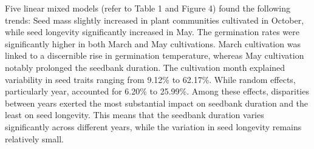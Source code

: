 \documentclass[a4paper, 11, margin=2cm]{article}
\begin{document}
      Five linear mixed models (refer to Table 1 and Figure 4) found the following trends: Seed mass slightly increased in plant communities cultivated in October, while seed longevity significantly increased in May. The germination rates were significantly higher in both March and May cultivations. March cultivation was linked to a discernible rise in germination temperature, whereas May cultivation notably prolonged the seedbank duration. The cultivation month explained variability in seed traits ranging from 9.12\% to 62.17\%. While random effects, particularly year, accounted for 6.20\% to 25.99\%. Among these effects, disparities between years exerted the most substantial impact on seedbank duration and the least on seed longevity. This means that the seedbank duration varies significantly across different years, while the variation in seed longevity remains relatively small.
\end{document}

